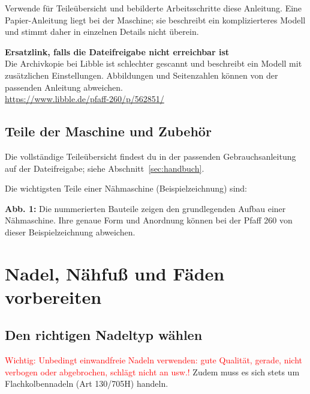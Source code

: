 \documentclass{\basedir/fablab-document}
\begin{document}
Verwende für Teileübersicht und bebilderte Arbeitsschritte diese Anleitung.
Eine Papier-Anleitung liegt bei der Maschine; sie beschreibt ein komplizierteres
Modell und stimmt daher in einzelnen Details nicht überein.

\noindent
\begin{minipage}[c]{0.16\linewidth}
\centering
{}
\end{minipage}\hfill
\begin{minipage}[c]{0.80\linewidth}
\textbf{Ersatzlink, falls die Dateifreigabe nicht erreichbar ist}\\[1mm]
Die Archivkopie bei Libble ist schlechter gescannt und beschreibt ein
Modell mit zusätzlichen Einstellungen. Abbildungen und Seitenzahlen können
von der passenden Anleitung abweichen.\\[1mm]
\url{https://www.libble.de/pfaff-260/p/562851/}
\end{minipage}

\clearpage
\subsection{Teile der Maschine und Zubehör}
Die vollständige Teileübersicht findest du in der passenden Gebrauchsanleitung auf der Dateifreigabe; siehe Abschnitt~\ref{sec:handbuch}.


Die wichtigsten Teile einer Nähmaschine (Beispielzeichnung) sind:
\begin{center}
	\resizebox{0.95\linewidth}{!}{}
	\par{\small \textbf{Abb. 1:} Die nummerierten Bauteile zeigen den grundlegenden Aufbau einer Nähmaschine. Ihre genaue Form und Anordnung können bei der Pfaff 260 von dieser Beispielzeichnung abweichen.}
\end{center}

\pagebreak
\section{Nadel, Nähfuß und Fäden vorbereiten}\label{sec:naehbereit}

\subsection{Den richtigen Nadeltyp wählen}
\textcolor{red}{Wichtig: Unbedingt einwandfreie Nadeln verwenden: gute Qualität, gerade, nicht verbogen oder abgebrochen, schlägt nicht an usw.!}
Zudem muss es sich stets um Flachkolbennadeln (Art 130/705H) handeln.
\newline
\end{document}
